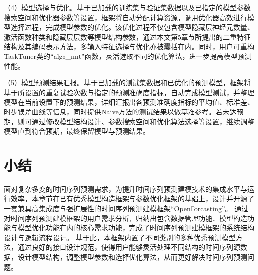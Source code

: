 （4）模型选择与优化。基于已加载的训练集与验证集数据以及已指定的模型参数搜索空间和优化器参数等设置，框架将自动分配计算资源，调用优化器高效进行模型选择过程，完成模型参数的优化。该优化过程不仅包含模型隐藏层神经元数量、激活函数种类和隐藏层层数等模型结构参数，通过本文第5章节所提出的二重特征结构及其编码表示方法，多输入特征选择与优化亦被囊括在内。同时，用户可重构TaskTuner类的“algo_init”函数，灵活选取不同的优化算法，进一步提高模型预测性能。

（5）模型预测结果汇报。基于已加载的测试集数据和已优化的预测模型，框架将基于所设置的重复试验次数与指定的预测准确度指标，自动完成模型测试，并整理模型在当前设置下的预测结果，详细汇报出各预测准确度指标的平均值、标准差、时步误差曲线等信息，同时提供Naive方法的测试结果以做基准参考。若未达预期，则可通过修改模型结构设计、参数搜索空间和优化算法选择等设置，继续调整模型直到符合预期，最终保留模型与预测结果。

\section{小结}
面对复杂多变的时间序列预测需求，为提升时间序列预测建模技术的集成水平与运行效率，本章节在已有优秀模型构造框架与参数优化框架的基础上，设计并开源了一套兼具高集成度与强扩展性的时间序列预测建模框架“OpenForcasting”。
通过对时间序列预测建模框架的用户需求分析，归纳出包含数据管理功能、模型构造功能与模型优化功能在内的核心需求功能，完成了时间序列预测建模框架的系统结构设计与逻辑流程设计。
基于此，本框架内置了不同类别的多种优秀预测模型方法，通过良好的接口设计规范，使得用户能够灵活处理不同结构的时间序列源数据，设计模型结构，调整模型参数和选择优化算法，从而更好解决时间序列预测问题。



